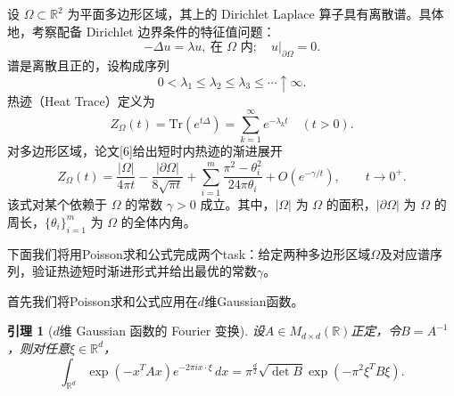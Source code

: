 \documentclass[UTF8,zihao=5,linespread=1.34]{ctexart}
\theoremstyle{cnplain}
\newtheorem{lemma}[theorem]{引理}
\theoremstyle{cnremark}
\begin{document}
设 $\Omega\subset\mathbb{R}^{2}$ 为平面多边形区域，其上的 Dirichlet Laplace 算子具有离散谱。具体地，考察配备 Dirichlet 边界条件的特征值问题：
\[
-\Delta u = \lambda u,\ \text{在 } \Omega \text{ 内};\quad u|_{\partial\Omega} = 0.
\]
谱是离散且正的，设构成序列
\[
0 < \lambda_{1} \leq \lambda_{2} \leq \lambda_{3} \leq \cdots \uparrow \infty.
\]
热迹（Heat Trace）定义为
\[
Z_{\Omega}(t) = \mathrm{Tr}(e^{t\Delta}) = \sum_{k=1}^{\infty} e^{-\lambda_{k}t}\quad (t > 0).
\]
对多边形区域，论文[6]给出短时内热迹的渐进展开
\[
Z_{\Omega}(t)
= \frac{|\Omega|}{4\pi t}
- \frac{|\partial\Omega|}{8\sqrt{\pi t}}
+ \sum_{i=1}^{m}\frac{\pi^{2}-\theta_{i}^{2}}{24\pi\theta_{i}}
+ O(e^{-\gamma/t}),
\qquad t\rightarrow0^{+}.
\]
该式对某个依赖于 $\Omega$ 的常数 $\gamma>0$ 成立。其中，$|\Omega|$ 为 $\Omega$ 的面积，$|\partial\Omega|$ 为 $\Omega$ 的周长，$\{\theta_i\}_{i=1}^{m}$ 为 $\Omega$ 的全体内角。

下面我们将用Poisson求和公式完成两个task：给定两种多边形区域$\Omega$及对应谱序列，验证热迹短时渐进形式并给出最优的常数$\gamma$。

首先我们将Poisson求和公式应用在$d$维Gaussian函数。

\begin{lemma}[$d$维 Gaussian 函数的 Fourier 变换]\label{lem:multivariate-gaussian}
设$A \in M_{d \times d}(\mathbb{R})$正定，令$B = A^{-1}$，则对任意$\xi \in \mathbb{R}^{d}$，
\[
\int_{\mathbb{R}^{d}} \exp(-x^{T} A x) e^{-2\pi i x \cdot \xi}\,dx
= \pi^{\frac{d}{2}} \sqrt{\det B} \exp(-\pi^{2} \xi^{T} B \xi).
\tag{G}\label{eq:multivariate-gaussian}
\]
\end{lemma}
\end{document}
